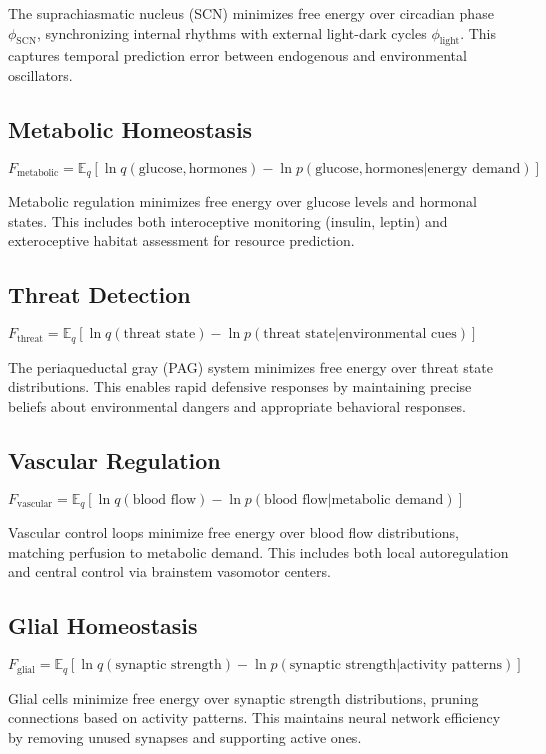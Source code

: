 \documentclass[10pt]{article}
\begin{document}
The suprachiasmatic nucleus (SCN) minimizes free energy over circadian phase $\phi_{\text{SCN}}$, synchronizing internal rhythms with external light-dark cycles $\phi_{\text{light}}$. This captures temporal prediction error between endogenous and environmental oscillators.

\subsection{Metabolic Homeostasis}
$F_{\text{metabolic}} = \mathbb{E}_q[\ln q(\text{glucose}, \text{hormones}) - \ln p(\text{glucose}, \text{hormones}|\text{energy demand})]$

Metabolic regulation minimizes free energy over glucose levels and hormonal states. This includes both interoceptive monitoring (insulin, leptin) and exteroceptive habitat assessment for resource prediction.

\subsection{Threat Detection}
$F_{\text{threat}} = \mathbb{E}_q[\ln q(\text{threat state}) - \ln p(\text{threat state}|\text{environmental cues})]$

The periaqueductal gray (PAG) system minimizes free energy over threat state distributions. This enables rapid defensive responses by maintaining precise beliefs about environmental dangers and appropriate behavioral responses.

\subsection{Vascular Regulation}
$F_{\text{vascular}} = \mathbb{E}_q[\ln q(\text{blood flow}) - \ln p(\text{blood flow}|\text{metabolic demand})]$

Vascular control loops minimize free energy over blood flow distributions, matching perfusion to metabolic demand. This includes both local autoregulation and central control via brainstem vasomotor centers.

\subsection{Glial Homeostasis}
$F_{\text{glial}} = \mathbb{E}_q[\ln q(\text{synaptic strength}) - \ln p(\text{synaptic strength}|\text{activity patterns})]$

Glial cells minimize free energy over synaptic strength distributions, pruning connections based on activity patterns. This maintains neural network efficiency by removing unused synapses and supporting active ones.
\end{document}
